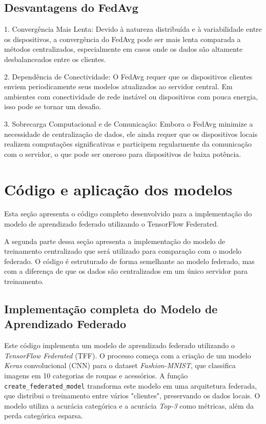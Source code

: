 \subsection{Desvantagens do FedAvg}

1. Convergência Mais Lenta: Devido à natureza distribuída e à variabilidade entre os dispositivos, a convergência do FedAvg pode ser mais lenta comparada a métodos centralizados, especialmente em casos onde os dados são altamente desbalanceados entre os clientes.

2. Dependência de Conectividade: O FedAvg requer que os dispositivos clientes enviem periodicamente seus modelos atualizados ao servidor central. Em ambientes com conectividade de rede instável ou dispositivos com pouca energia, isso pode se tornar um desafio.

3. Sobrecarga Computacional e de Comunicação: Embora o FedAvg minimize a necessidade de centralização de dados, ele ainda requer que os dispositivos locais realizem computações significativas e participem regularmente da comunicação com o servidor, o que pode ser oneroso para dispositivos de baixa potência.

\section{Código e aplicação dos modelos}

Esta seção apresenta o código completo desenvolvido para a implementação do modelo de aprendizado federado utilizando o TensorFlow Federated.

A segunda parte dessa seção apresenta a implementação do modelo de treinamento centralizado que será utilizado para comparação com o modelo federado. O código é estruturado de forma semelhante ao modelo federado, mas com a diferença de que os dados são centralizados em um único servidor para treinamento.

\subsection{Implementação completa do Modelo de Aprendizado Federado}

Este código implementa um modelo de aprendizado federado utilizando o \textit{TensorFlow Federated} (TFF). O processo começa com a criação de um modelo \textit{Keras} convolucional (CNN) para o dataset \textit{Fashion-MNIST}, que classifica imagens em 10 categorias de roupas e acessórios. A função \texttt{create\_federated\_model} transforma este modelo em uma arquitetura federada, que distribui o treinamento entre vários "clientes", preservando os dados locais. O modelo utiliza a acurácia categórica e a acurácia \textit{Top-3} como métricas, além da perda categórica esparsa.

